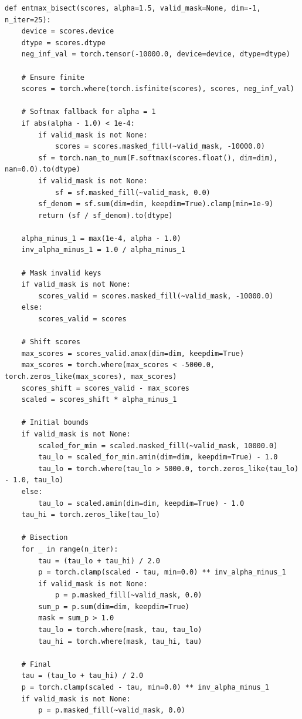 \begin{lstlisting}
def entmax_bisect(scores, alpha=1.5, valid_mask=None, dim=-1, n_iter=25):
    device = scores.device
    dtype = scores.dtype
    neg_inf_val = torch.tensor(-10000.0, device=device, dtype=dtype)
    
    # Ensure finite
    scores = torch.where(torch.isfinite(scores), scores, neg_inf_val)
    
    # Softmax fallback for alpha = 1
    if abs(alpha - 1.0) < 1e-4:
        if valid_mask is not None:
            scores = scores.masked_fill(~valid_mask, -10000.0)
        sf = torch.nan_to_num(F.softmax(scores.float(), dim=dim), nan=0.0).to(dtype)
        if valid_mask is not None:
            sf = sf.masked_fill(~valid_mask, 0.0)
        sf_denom = sf.sum(dim=dim, keepdim=True).clamp(min=1e-9)
        return (sf / sf_denom).to(dtype)
    
    alpha_minus_1 = max(1e-4, alpha - 1.0)
    inv_alpha_minus_1 = 1.0 / alpha_minus_1
    
    # Mask invalid keys
    if valid_mask is not None:
        scores_valid = scores.masked_fill(~valid_mask, -10000.0)
    else:
        scores_valid = scores
    
    # Shift scores
    max_scores = scores_valid.amax(dim=dim, keepdim=True)
    max_scores = torch.where(max_scores < -5000.0, torch.zeros_like(max_scores), max_scores)
    scores_shift = scores_valid - max_scores
    scaled = scores_shift * alpha_minus_1
    
    # Initial bounds
    if valid_mask is not None:
        scaled_for_min = scaled.masked_fill(~valid_mask, 10000.0)
        tau_lo = scaled_for_min.amin(dim=dim, keepdim=True) - 1.0
        tau_lo = torch.where(tau_lo > 5000.0, torch.zeros_like(tau_lo) - 1.0, tau_lo)
    else:
        tau_lo = scaled.amin(dim=dim, keepdim=True) - 1.0
    tau_hi = torch.zeros_like(tau_lo)
    
    # Bisection
    for _ in range(n_iter):
        tau = (tau_lo + tau_hi) / 2.0
        p = torch.clamp(scaled - tau, min=0.0) ** inv_alpha_minus_1
        if valid_mask is not None:
            p = p.masked_fill(~valid_mask, 0.0)
        sum_p = p.sum(dim=dim, keepdim=True)
        mask = sum_p > 1.0
        tau_lo = torch.where(mask, tau, tau_lo)
        tau_hi = torch.where(mask, tau_hi, tau)
    
    # Final
    tau = (tau_lo + tau_hi) / 2.0
    p = torch.clamp(scaled - tau, min=0.0) ** inv_alpha_minus_1
    if valid_mask is not None:
        p = p.masked_fill(~valid_mask, 0.0)
    

\end{lstlisting}

